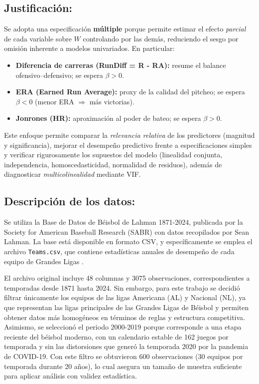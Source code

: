 \documentclass[man,floatsintext]{apa7}
\begin{document}
\subsection{Justificación:}
Se adopta una especificación \textbf{múltiple} porque permite estimar el efecto \emph{parcial} de cada variable sobre $W$ controlando por las demás, reduciendo el sesgo por omisión inherente a modelos univariados. En particular:
\begin{itemize}
    \item \textbf{Diferencia de carreras (RunDiff = R - RA):} resume el balance ofensivo--defensivo; se espera $\beta>0$.
    \item \textbf{ERA (Earned Run Average):} proxy de la calidad del pitcheo; se espera $\beta<0$ (menor ERA $\Rightarrow$ más victorias).
    \item \textbf{Jonrones (HR):} aproximación al poder de bateo; se espera $\beta>0$.
\end{itemize}
Este enfoque permite comparar la \emph{relevancia relativa} de los predictores (magnitud y significancia), mejorar el desempeño predictivo frente a especificaciones simples y verificar rigurosamente los supuestos del modelo (linealidad conjunta, independencia, homoscedasticidad, normalidad de residuos), además de diagnosticar \emph{multicolinealidad} mediante VIF.
%
\subsection{Descripción de los datos:}
Se utiliza la Base de Datos de Béisbol de Lahman 1871-2024, publicada por la Society for American Baseball Research (SABR) con datos recopilados por Sean Lahman. La base está disponible en formato CSV, y específicamente se emplea el archivo \texttt{Teams.csv}, que contiene estadísticas anuales de desempeño de cada equipo de Grandes Ligas . 

El archivo original incluye 48 columnas y 3075 observaciones, correspondientes a temporadas desde 1871 hasta 2024. Sin embargo, para este trabajo se decidió filtrar únicamente los equipos de las ligas Americana (AL) y Nacional (NL), ya que representan las ligas principales de las Grandes Ligas de Béisbol y permiten obtener datos más homogéneos en términos de reglas y estructura competitiva. Asimismo, se seleccionó el periodo 2000-2019 porque corresponde a una etapa reciente del béisbol moderno, con un calendario estable de 162 juegos por temporada y sin las distorsiones que generó la temporada 2020 por la pandemia de COVID-19. Con este filtro se obtuvieron 600 observaciones (30 equipos por temporada durante 20 años), lo cual asegura un tamaño de muestra suficiente para aplicar análisis con validez estadística.
\end{document}
